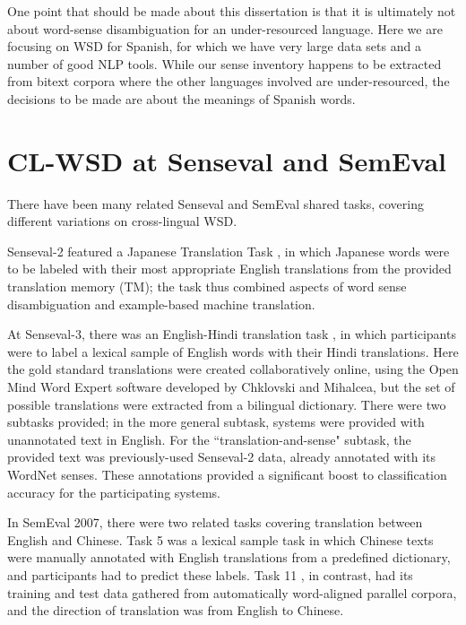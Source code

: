 One point that should be made about this dissertation is that it is ultimately
not about word-sense disambiguation for an under-resourced language.  Here we
are focusing on WSD for Spanish, for which we have very large data sets and a
number of good NLP tools. While our sense inventory happens to be extracted
from bitext corpora where the other languages involved are under-resourced, the
decisions to be made are about the meanings of Spanish words.

\section{CL-WSD at Senseval and SemEval}
There have been many related Senseval and SemEval shared tasks, covering
different variations on cross-lingual WSD.

Senseval-2 featured a Japanese Translation Task \cite{kurohashi:2001:SENSEVAL},
in which Japanese words were to be labeled with their most appropriate English
translations from the provided translation memory (TM); the task thus combined
aspects of word sense disambiguation and example-based machine translation.

At Senseval-3, there was an English-Hindi translation task
\cite{chklovski-EtAl:2004:Senseval-3}, in which participants were to label a
lexical sample of English words with their Hindi translations. Here the gold
standard translations were created collaboratively online, using the Open Mind
Word Expert software developed by Chklovski and Mihalcea, but the set of
possible translations were extracted from a bilingual dictionary. There were
two subtasks provided; in the more general subtask, systems were provided with
unannotated text in English. For the ``translation-and-sense" subtask, the
provided text was previously-used Senseval-2 data, already annotated with its
WordNet senses. These annotations provided a significant boost to
classification accuracy for the participating systems.

In SemEval 2007, there were two related tasks covering translation between
English and Chinese. Task 5 \cite{jin-wu-yu:2007:SemEval-2007} was a lexical
sample task in which Chinese texts were manually annotated with English
translations from a predefined dictionary, and participants had to predict
these labels. Task 11 \cite{ng-chan:2007:SemEval-2007}, in contrast, had its
training and test data gathered from automatically word-aligned parallel
corpora, and the direction of translation was from English to Chinese.

